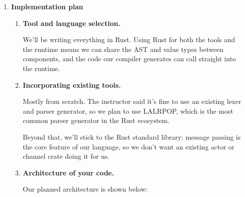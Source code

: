 \documentclass[11pt]{article}
\begin{document}
\begin{enumerate}
\bigbreak


\item
\textbf{Implementation plan}

\begin{enumerate}[label*=\arabic*.]

\item
\textbf{Tool and language selection.}

We'll be writing everything in Rust. Using Rust for both the tools and the runtime means we can share the AST and
value types between components, and the code our compiler generates can call straight into the runtime.

\item
\textbf{Incorporating existing tools.}

Mostly from scratch. The instructor said it's fine to use an existing lexer and parser generator, so we plan to use
LALRPOP\cite{lalrpop}, which is the most common parser generator in the Rust ecosystem.

\medbreak
Beyond that, we'll stick to the Rust standard library: message passing is the core feature of our language, so we
don't want an existing actor or channel crate doing it for us.

\item
\textbf{Architecture of your code.}

Our planned architecture is shown below:

\begin{figure}[ht]
  \centering
\end{figure}
\end{enumerate}
\end{enumerate}
\end{document}
